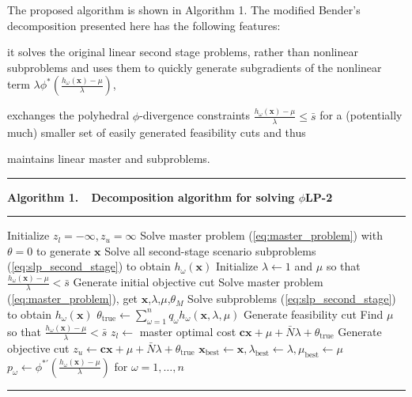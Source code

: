 \documentclass[opre,nonblindrev]{informs3} %
\newcommand{\x}{\mathbf{x}}
\renewcommand{\c}{\mathbf{c}}
\newcommand{\plp}{$\phi$LP-2}
\begin{document}
The proposed algorithm is shown in Algorithm 1. 
The modified Bender's decomposition presented here has the following features:
\begin{inparaenum}
	\item it solves the original linear second stage problems, rather than nonlinear subproblems and uses them to quickly generate subgradients of the nonlinear term $\lambda \phi^*\left(\tfrac{h_\omega(\x) - \mu}{\lambda}\right)$, 
	\item exchanges the polyhedral $\phi$-divergence constraints $\tfrac{h_\omega(\x) - \mu}{\lambda} \leq \bar{s}$ for a (potentially much) smaller set of easily generated feasibility cuts and thus
	\item  maintains linear master and subproblems.\medskip
\end{inparaenum}


\begin{center}
\begin{minipage}{.61\textwidth}
	\TableSpaced
	\hrule
	\vspace{1pt}
    {\bf \small Algorithm 1.\ \ Decomposition algorithm for solving \plp}
	\hrule
	\vspace{1pt}
	\begin{algorithmic}
		\State Initialize $z_l = -\infty, z_u = \infty$
		\State Solve master problem (\ref{eq:master_problem}) with $\theta = 0$ to generate $\x$
		\State Solve all second-stage scenario subproblems (\ref{eq:slp_second_stage}) to obtain $h_\omega(\x)$
		\State Initialize $\lambda \gets 1$ and $\mu$ so that $\frac{h_\omega(\x) - \mu}{\lambda} < \bar{s}$
		\State Generate initial objective cut
			\State Solve master problem (\ref{eq:master_problem}), get $\x$,$\lambda$,$\mu$,$\theta_M$
			\State Solve subproblems (\ref{eq:slp_second_stage}) to obtain  $h_\omega(\x)$
			\State $\theta_{\text{true}} \gets \sum_{\omega=1}^n q_\omega h_\omega(\x,\lambda,\mu)$
			\If{$\frac{h_\omega(\x) - \mu}{\lambda} > \bar{s}$}
				\State Generate feasibility cut
				\State Find $\mu$ so that $\frac{h_\omega(\x) - \mu}{\lambda} < \bar{s}$
			\Else
				\State $z_l \gets$ master optimal cost $\c\x + \mu + \bar{N}\lambda + \theta_{\text{true}}$
			\EndIf
			\State Generate objective cut
			\If{$\c\x + \mu + \bar{N}\lambda + \theta_{\text{true}} < z_u$}
				\State $z_u \gets \c\x + \mu + \bar{N}\lambda + \theta_{\text{true}}$
				\State $\x_\text{best} \gets \x, \lambda_\text{best} \gets \lambda, \mu_\text{best} \gets \mu$
				\State $p_\omega \gets \phi^{*\prime}(\tfrac{h_\omega(\x) - \mu}{\lambda})$ for $\omega = 1, \dots, n$
			\EndIf
		\EndWhile
	\end{algorithmic}
	\hrule
\end{minipage}
\end{center}
\end{document}
